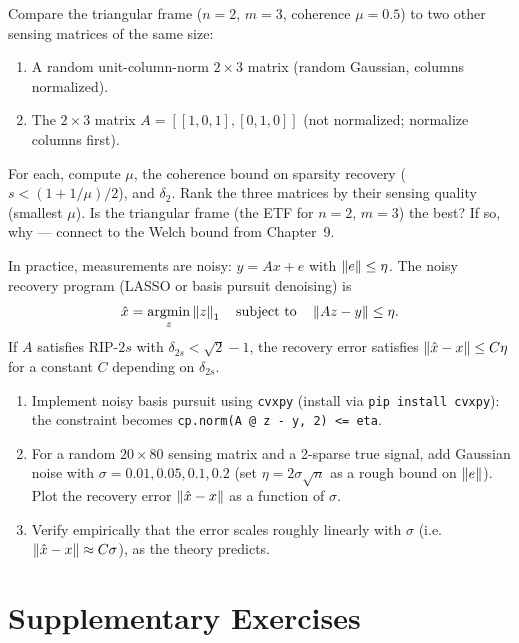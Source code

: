 \begin{exercisebox}[title={Lab Exercise 12.4: ETFs as Sensing Matrices}]
Compare the triangular frame ($n=2$, $m=3$, coherence $\mu=0.5$) to
two other sensing matrices of the same size:
\begin{enumerate}[label=(\alph*)]
  \item A random unit-column-norm $2\times3$ matrix (random Gaussian,
        columns normalized).
  \item The $2\times3$ matrix $A=[[1,0,1],[0,1,0]]$ (not normalized;
        normalize columns first).
\end{enumerate}
For each, compute $\mu$, the coherence bound on sparsity recovery
($s<(1+1/\mu)/2$), and $\delta_2$. Rank the three matrices by their
sensing quality (smallest $\mu$). Is the triangular frame (the ETF for
$n=2$, $m=3$) the best? If so, why --- connect to the Welch bound from
Chapter~9.
\end{exercisebox}

\begin{exercisebox}[title={Lab Exercise 12.5 (Challenge): Noisy Measurements}]
In practice, measurements are noisy: $y = Ax + e$ with $\left\| e \right\|\le\eta$.
The noisy recovery program (LASSO or basis pursuit denoising) is
\[
  \hat x = \operatorname*{argmin}_{z}\left\| z \right\|_1
  \quad\text{subject to}\quad\left\| Az-y \right\|\le\eta.
\]
If $A$ satisfies RIP-$2s$ with $\delta_{2s}<\sqrt{2}-1$, the recovery
error satisfies $\left\| \hat x - x \right\|\le C\eta$ for a constant $C$
depending on $\delta_{2s}$.
\begin{enumerate}[label=(\alph*)]
  \item Implement noisy basis pursuit using \texttt{cvxpy} (install
        via \texttt{pip install cvxpy}): the constraint becomes
        \texttt{cp.norm(A @ z - y, 2) <= eta}.
  \item For a random $20\times80$ sensing matrix and a 2-sparse true
        signal, add Gaussian noise with $\sigma=0.01,0.05,0.1,0.2$
        (set $\eta=2\sigma\sqrt{n}$ as a rough bound on $\left\| e \right\|$).
        Plot the recovery error $\left\| \hat x - x \right\|$ as a function of
        $\sigma$.
  \item Verify empirically that the error scales roughly linearly
        with $\sigma$ (i.e.\ $\left\| \hat x-x \right\|\approx C\sigma$), as the
        theory predicts.
\end{enumerate}
\end{exercisebox}

\newpage
\section{Supplementary Exercises}
\label{sec:extra-ch12}

